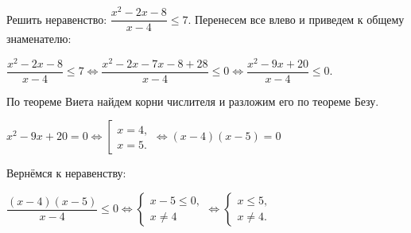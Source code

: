  Решить неравенство: $\dfrac{x^2-2x-8}{x-4}\leq7.$
\Solution Перенесем все влево и приведем к общему знаменателю:
\begin{center}
$\dfrac{x^2-2x-8}{x-4}\leq7 \Leftrightarrow \dfrac{x^2-2x-7x-8+28}{x-4}\leq0 \Leftrightarrow \dfrac{x^2-9x+20}{x-4}\leq0.$\\
\end{center}
По теореме Виета найдем корни числителя и разложим его по теореме Безу.
\begin{center}
$x^2-9x+20=0 \Leftrightarrow  \left[
\begin{array}{l}
    x=4,\\
    x=5.
  \end{array}
\right. \Leftrightarrow (x-4)(x-5)=0$
\end{center}
Вернёмся к неравенству:
\begin{center}
$\dfrac{(x-4)(x-5)}{x-4}\leq0 \Leftrightarrow \left\{
\begin{array}{l}
x-5\leq0,\\
x\neq4
\end{array} \right. \Leftrightarrow \left\{
\begin{array}{l}
x\leq5,\\
x\neq4.
\end{array} \right.$
\end{center}
\Answer{$(-\infty; 5]\setminus\{4\}$}
